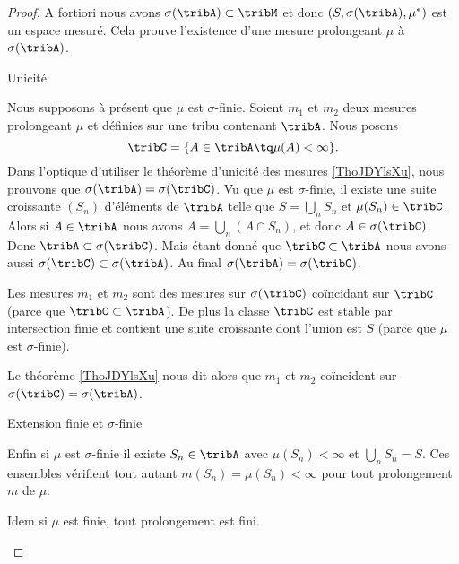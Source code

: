 \begin{proof}
    A fortiori nous avons \( \sigma(\tribA)\subset\tribM\) et donc \( (S,\sigma(\tribA),\mu^*)\) est un espace mesuré. Cela prouve l'existence d'une mesure prolongeant \( \mu\) à \( \sigma(\tribA)\).

    \begin{subproof}
        \item[Unicité]

            Nous supposons à présent que \( \mu\) est \( \sigma\)-finie. Soient \( m_1\) et \( m_2\) deux mesures prolongeant \( \mu\) et définies sur une tribu contenant \( \tribA\). Nous posons
            \begin{equation}
                \tribC=\{ A\in\tribA\tq\mu(A)<\infty \}.
            \end{equation}
            Dans l'optique d'utiliser le théorème d'unicité des mesures \ref{ThoJDYlsXu}, nous prouvons que \( \sigma(\tribA)=\sigma(\tribC)\). Vu que \( \mu\) est \( \sigma\)-finie, il existe une suite croissante \( (S_n)\) d'éléments de \( \tribA\) telle que \( S=\bigcup_nS_n\) et \( \mu(S_n)\in\tribC\). Alors si \( A\in\tribA\) nous avons \( A=\bigcup_n(A\cap S_n)\), et donc \( A\in\sigma(\tribC)\). Donc \( \tribA\subset\sigma(\tribC)\). Mais étant donné que \( \tribC\subset\tribA\) nous avons aussi \( \sigma(\tribC)\subset\sigma(\tribA)\). Au final \( \sigma(\tribA)=\sigma(\tribC)\).

            Les mesures \( m_1\) et \( m_2\) sont des mesures sur \( \sigma(\tribC)\) coïncidant sur \( \tribC\) (parce que \( \tribC\subset\tribA\)). De plus la classe \( \tribC\) est stable par intersection finie et contient une suite croissante dont l'union est \( S\) (parce que \( \mu\) est \( \sigma\)-finie).

            Le théorème \ref{ThoJDYlsXu} nous dit alors que \( m_1\) et \( m_2\) coïncident sur \( \sigma(\tribC)=\sigma(\tribA)\).

        \item[Extension finie et \( \sigma\)-finie]

            Enfin si \( \mu\) est \( \sigma\)-finie il existe \( S_n\in\tribA\) avec \( \mu(S_n)<\infty\) et \( \bigcup_nS_n=S\). Ces ensembles vérifient tout autant \( m(S_n)=\mu(S_n)<\infty\) pour tout prolongement \( m\) de \( \mu\).

            Idem si \( \mu\) est finie, tout prolongement est fini.
    \end{subproof}
\end{proof}

